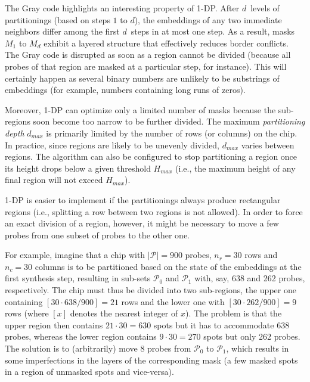 The Gray code highlights an interesting property of 1-DP. After $d$~levels of
partitionings (based on steps $1$ to $d$), the embeddings of any two immediate
neighbors differ among the first $d$~steps in at most one step.  As a result,
masks $M_1$ to $M_d$ exhibit a layered structure that effectively reduces
border conflicts. The Gray code is disrupted as soon as a region cannot be
divided (because all probes of that region are masked at a particular step,
for instance). This will certainly happen as several binary numbers are unlikely
to be substrings of embeddings (for example, numbers containing long runs of
zeros).

Moreover, 1-DP can optimize only a limited number of masks because the
sub-regions soon become too narrow to be further divided. The maximum
\emph{partitioning depth} $d_{max}$ is primarily limited by the number of rows
(or columns) on the chip. In practice, since regions are likely to be unevenly
divided, $d_{max}$ varies between regions. The algorithm can also be configured
to stop partitioning a region once its height drops below a given threshold
$H_{max}$ (i.e., the maximum height of any final region will not exceed
$H_{max}$).

1-DP is easier to implement if the partitionings always produce rectangular
regions (i.e., splitting a row between two regions is not allowed). In order to
force an exact division of a region, however, it might be necessary to move a
few probes from one subset of probes to the other one.

For example, imagine that a chip with $|\mathcal{P}| = 900$ probes, $n_r = 30$
rows and $n_c = 30$ columns is to be partitioned based on the state of the
embeddings at the first synthesis step, resulting in sub-sets $\mathcal{P}_0$
and $\mathcal{P}_1$ with, say, 638 and 262 probes, respectively. The chip must
thus be divided into two sub-regions, the upper one containing
$[30 \cdot 638/900]=21$ rows and the lower one with $[30 \cdot 262/900]=9$ rows
(where $[x]$ denotes the nearest integer of $x$). The problem is that the upper
region then contains $21 \cdot 30 = 630$ spots but it has to accommodate 638
probes, whereas the lower region contains $9 \cdot 30 = 270$ spots but only 262
probes. The solution is to (arbitrarily) move 8 probes from $\mathcal{P}_0$ to
$\mathcal{P}_1$, which results in some imperfections in the layers of the
corresponding mask (a few masked spots in a region of unmasked spots and
vice-versa).

